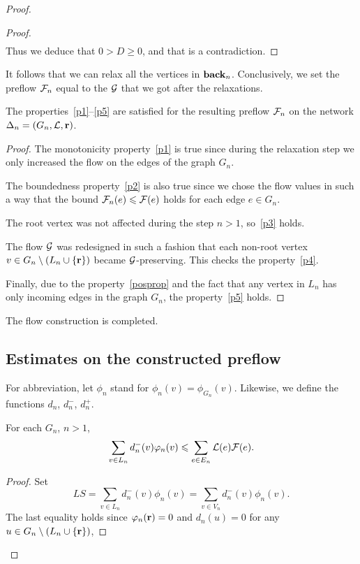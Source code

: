 \documentclass[12pt,oneside,a4paper]{amsart}
\begin{document}
\begin{proof}
\begin{proof}
\[\begin{split}
            \end{split}
          \]
          Thus we deduce that $0 > D \geq 0$, and that is a contradiction.
        \end{proof}
        It follows that we can relax all the vertices in $\eback_n$.
        Conclusively, we set the preflow $\flowposn{n}$ equal to the $\cal{G}$ that we got after the relaxations.
        \begin{prop}
          The properties~\ref{p1}--\ref{p5} are satisfied for the resulting preflow $\flowposn{n}$ on the network $\net_n = (G_n, \len, \root)$.
        \end{prop}
        \begin{proof}
          The monotonicity property~\ref{p1} is true since during the relaxation step we
            only increased the flow on the edges of the graph $G_n$.

          The boundedness property~\ref{p2} is also true since we chose the flow values in such a way
            that the bound $\flowposn{n}(e) \leq \flowpos(e)$ holds for each edge $e\in G_n$.

          The root vertex was not affected during the step $n > 1$, so~\ref{p3} holds.

          The flow $\cal{G}$ was redesigned in such a fashion that each non-root vertex $v \in G_{n} \setminus 
            \left(L_n \cup \{\root\}\right)$ became $\cal{G}$-preserving.
          This checks the property~\ref{p4}.

          Finally, due to the property~\ref{posprop} and the fact that
          any vertex in $L_n$ has only incoming edges in the graph $G_n$, the property~\ref{p5} holds.
        \end{proof}
        The flow construction is completed.

        \medskip
        \subsection{Estimates on the constructed preflow}
          For abbreviation, let $\phi_n$ stand for $\phi_n(v) = \phi_{G_n}(v)$.
          Likewise, we define the functions $d_n$, $d^{-}_n$, $d^{+}_n$.
          \begin{lemma}
            For each $G_n$, $n > 1$,
            \begin{equation}
              \label{main-ineq}
              \sum_{v\in L_n}d_{n}^{-}(v) \phi_n(v) \leq \sum_{e \in E_n} \len(e) \flowpos(e).
            \end{equation}
          \end{lemma}
          \begin{proof}
            Set
            \[
              LS = \sum_{v \in L_n} d_n^{-}(v) \phi_n(v) = \sum_{v \in V_n} d_n^{-}(v) \phi_n(v).
            \]
            The last equality holds since $\phi_n(\root) = 0$ and $d_n(u) = 0$
              for any $u \in G_{n} \setminus \left(L_n \cup \{\root\}\right)$,


\end{proof}
\end{proof}
\end{document}
